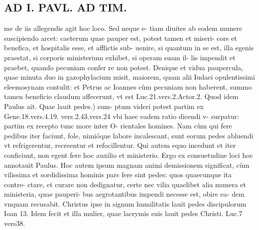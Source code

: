 \documentclass{article}
\begin{document}
\begin{pages}
\section*{AD I. PAVL. AD TIM. }
\marginpar{[ p.A0O ]}\pstart me de iis allegendis agit hoc loco. Sed neque e- tiam diuites ab eodem munere suscipiendo arcet: caeterum quae pauper est, potest tamen et miseri- cors et benefica, et hospitalis esse, et afflictis sub- uenire, si quantum in se est, illa egenis praestat, si corporis ministerium exhibet, si operam suam il- lis impendit et praebet, quando pecuniam confer re non potest. Denique et vidua paupercula, quae minuta duo in gazophylacium misit, maiorem, quam alii Iudaei opulentissimi eleemosynam contulit: et Petrus ac Ioannes cùm pecuniam non haberent, summo tamen beneficio claudum affecerunt, vt est Luc.21.vers.2.Actor.2.  \pend\pstart Quod idem Paulus ait. Quae lauit pedes.) sum- ptum videri potest partim ex Gene.18.vers.4.19. vers.2.43.vers.24 vbi haec eadem ratio dicendi v- surpatur: partim ex recepto tunc more inter O- rientales homines. Nam cùm qui fere pedibus iter faciunt, fole, nimióque labore incalescant, sunt eorum pedes abluendi vt refrigerentur, recreentur et refocillentur. Qui autem equo incedunt et iter conficiunt, non egent fere hoc auxilio et ministerio. Ergo ex consuetudine loci hoc annotauit Paulus. Hoc autem ipsum magnam animi demissionem significat, cùm vilissima et sordidissima hominis pars fere sint pedes: quos quaecunque ita contre- ctare, et curare non dedignatur, certe nec vilia quaelibet alia munera et ministeria, quae pauperi- bus aegrotantibus impendi necesse est, obire ea- dem vnquam recusabit. Christus ipse in signum humilitatis lauit pedes discipulorum Ioan 13. Idem fecit et illa mulier, quae lacrymis suis lauit pedes Christi. Luc.7 vers38.  \pend

\end{pages}
\end{document}
